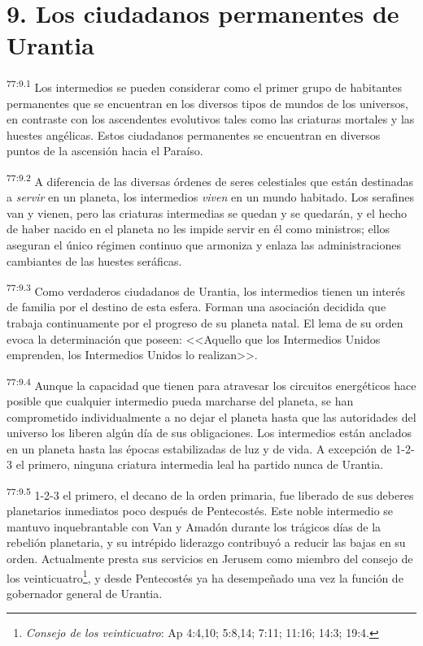\section*{9. Los ciudadanos permanentes de Urantia}
\par
\textsuperscript{77:9.1} Los intermedios se pueden considerar como el primer grupo de habitantes permanentes que se encuentran en los diversos tipos de mundos de los universos, en contraste con los ascendentes evolutivos tales como las criaturas mortales y las huestes angélicas. Estos ciudadanos permanentes se encuentran en diversos puntos de la ascensión hacia el Paraíso.

\par
\textsuperscript{77:9.2} A diferencia de las diversas órdenes de seres celestiales que están destinadas a \textit{servir} en un planeta, los intermedios \textit{viven} en un mundo habitado. Los serafines van y vienen, pero las criaturas intermedias se quedan y se quedarán, y el hecho de haber nacido en el planeta no les impide servir en él como ministros; ellos aseguran el único régimen continuo que armoniza y enlaza las administraciones cambiantes de las huestes seráficas.

\par
\textsuperscript{77:9.3} Como verdaderos ciudadanos de Urantia, los intermedios tienen un interés de familia por el destino de esta esfera. Forman una asociación decidida que trabaja continuamente por el progreso de su planeta natal. El lema de su orden evoca la determinación que poseen: <<Aquello que los Intermedios Unidos emprenden, los Intermedios Unidos lo realizan>>.

\par
\textsuperscript{77:9.4} Aunque la capacidad que tienen para atravesar los circuitos energéticos hace posible que cualquier intermedio pueda marcharse del planeta, se han comprometido individualmente a no dejar el planeta hasta que las autoridades del universo los liberen algún día de sus obligaciones. Los intermedios están anclados en un planeta hasta las épocas estabilizadas de luz y de vida. A excepción de 1-2-3 el primero, ninguna criatura intermedia leal ha partido nunca de Urantia.

\par
\textsuperscript{77:9.5} 1-2-3 el primero, el decano de la orden primaria, fue liberado de sus deberes planetarios inmediatos poco después de Pentecostés. Este noble intermedio se mantuvo inquebrantable con Van y Amadón durante los trágicos días de la rebelión planetaria, y su intrépido liderazgo contribuyó a reducir las bajas en su orden. Actualmente presta sus servicios en Jerusem como miembro del consejo de los veinticuatro\footnote{\textit{Consejo de los veinticuatro}: Ap 4:4,10; 5:8,14; 7:11; 11:16; 14:3; 19:4.}, y desde Pentecostés ya ha desempeñado una vez la función de gobernador general de Urantia.

